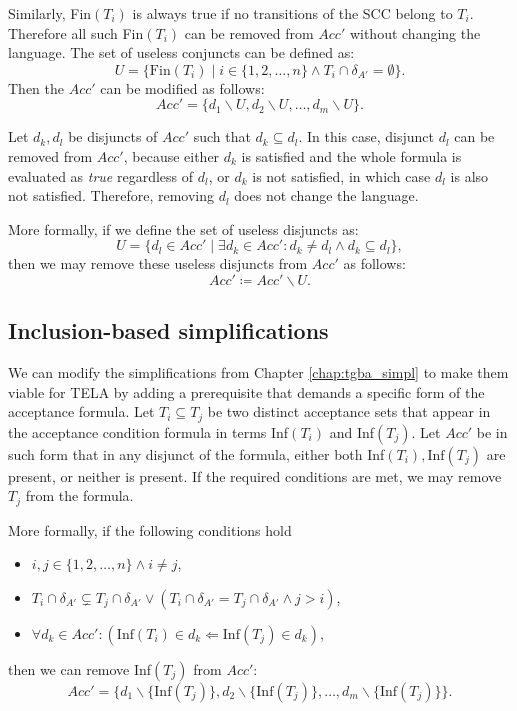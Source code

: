 \documentclass[
  digital, %
  twoside, %
  table,   %
  lof,     %
  lot,     %
]{fithesis3}
\begin{document}
Similarly, Fin$(T_i)$ is always true if no transitions of the SCC belong to $T_i$. Therefore all such Fin$(T_i)$ can be removed from $Acc'$ without changing the language.
The set of useless conjuncts can be defined as:
\begin{equation*}
  U = \{\text{Fin}(T_i) \mid i \in \{1,2, \dots, n\} \wedge T_i \cap \delta_{A'} = \emptyset\}.
\end{equation*}
Then the $Acc'$ can be modified as follows:
\begin{equation*}
  Acc' = \{d_1 \smallsetminus U, d_2 \smallsetminus U, \dots, d_m \smallsetminus U\}.
\end{equation*}

Let $d_k, d_l$ be disjuncts of $Acc'$ such that $d_k \subseteq d_l$. In this case, disjunct $d_l$ can be removed from $Acc'$, because either $d_k$ is satisfied and the whole formula is evaluated as \emph{true} regardless of $d_l$, or $d_k$ is not satisfied, in which case $d_l$ is also not satisfied. Therefore, removing $d_l$ does not change the language.

More formally, if we define the set of useless disjuncts as:
\begin{equation*}
  U = \{d_l \in Acc' \mid \exists d_k \in Acc' \colon d_k \neq d_l \wedge d_k \subseteq d_l\},
\end{equation*}
then we may remove these useless disjuncts from $Acc'$ as follows:
\begin{equation*}
  Acc' \coloneqq Acc' \smallsetminus U.
\end{equation*}

\subsection{Inclusion-based simplifications}
We can modify the simplifications from Chapter \ref{chap:tgba_simpl} to make them viable for TELA by adding a prerequisite that demands a specific form of the acceptance formula. Let $T_i \subseteq T_j$ be two distinct acceptance sets that appear in the acceptance condition formula in terms Inf$(T_i)$ and Inf$(T_j)$. Let $Acc'$ be in such form that in any disjunct of the formula, either both Inf$(T_i), \text{Inf}(T_j)$ are present, or neither is present. If the required conditions are met, we may remove $T_j$ from the formula. 

More formally, if the following conditions hold
\begin{itemize}
  \item $i, j \in \{1, 2, \dots, n\} \wedge i \neq j$,
  \item $T_i \cap \delta_{A'} \subsetneq T_j \cap \delta_{A'} \vee (T_i \cap \delta_{A'} = T_j \cap \delta_{A'} \wedge j > i)$,
  \item $\forall d_k \in Acc' \colon (\text{Inf}(T_i) \in d_k \Leftarrow \text{Inf}(T_j) \in d_k)$,
\end{itemize}
then we can remove Inf$(T_j)$ from $Acc'$: 
\begin{equation*}
  Acc' = \{d_1 \smallsetminus \{\text{Inf}(T_j)\}, d_2 \smallsetminus \{\text{Inf}(T_j)\}, \dots, d_m \smallsetminus \{\text{Inf}(T_j)\}\}.
\end{equation*} 
\end{document}
